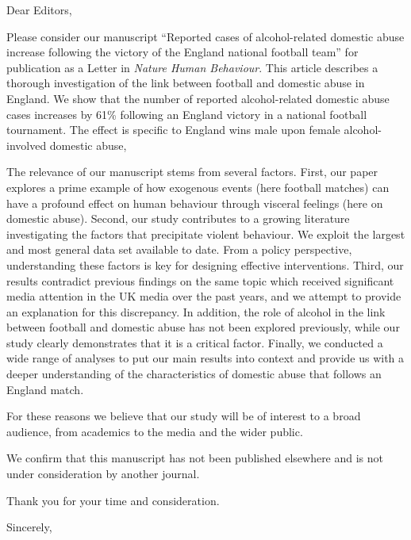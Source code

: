 \documentclass{letter}
\begin{document}
\begin{letter}
{}
\opening{Dear Editors,} %

Please consider our manuscript ``Reported cases of alcohol-related domestic abuse increase following the victory of the England national football team'' for publication as a Letter in \textit{Nature Human Behaviour}. This article describes a thorough investigation of the link between football and domestic abuse in England. We show that the number of reported alcohol-related domestic abuse cases increases by 61\% following an England victory
in a national football tournament. The effect is specific to England wins male upon female alcohol-involved domestic abuse, 

The relevance of our manuscript stems from several factors. First, our paper explores a prime example of how exogenous events (here football matches) can have a profound effect on human behaviour through visceral feelings (here on domestic abuse). Second, our study contributes to a growing literature investigating the factors that precipitate violent behaviour. We exploit the largest and most general data set available to date. From a policy perspective, understanding these factors is key for designing effective interventions. Third, our results contradict previous findings on the same topic which received significant media attention in the UK media over the past years, and we attempt to provide an explanation for this discrepancy. In addition, the role of alcohol in the link between football and domestic abuse has not been explored previously, while our study clearly demonstrates that it is a critical factor. Finally, we conducted a wide range of analyses to put our main results into context and provide us with a deeper understanding of the characteristics of domestic abuse that follows an England match.

For these reasons we believe that our study will be of interest to a broad audience, from academics to the media and the wider public.

We confirm that this manuscript has not been published elsewhere and is not under consideration by another journal.

Thank you for your time and consideration.

\closing{Sincerely,}



\end{letter}
\end{document}
